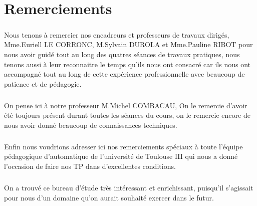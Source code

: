 \documentclass[12pt, a4paper, openany]{report}
\begin{document}
\chapter*{Remerciements}
  
  \paragraph{}
   Nous tenons à remercier nos encadreurs et professeurs de travaux dirigés, Mme.Euriell LE CORRONC, M.Sylvain DUROLA et Mme.Pauline RIBOT pour nous avoir guidé tout au long des quatres séances de travaux pratiques, nous tenons aussi à leur reconnaitre le temps qu'ils nous ont consacré car ils nous ont accompagné tout au long de cette expérience professionnelle avec beaucoup de patience et de pédagogie. \\ 
   
  \paragraph{}
   On pense ici à notre professeur M.Michel COMBACAU, On le remercie d’avoir été toujours présent durant toutes les séances du cours, on le remercie encore de nous avoir donné beaucoup de connaissances techniques.\\
 
  \paragraph{} 
   Enfin nous voudrions adresser ici nos remerciements spéciaux à toute l’équipe pédagogique d’automatique de l'université de Toulouse III qui nous a donné l’occasion de faire nos TP dans d'excellentes conditions.   \\

  \paragraph{}  
  On a trouvé ce bureau d’étude  très intéressant et enrichissant, puisqu’il s’agissait pour nous d’un domaine qu'on aurait souhaité exercer dans le futur. \\
   
\renewcommand{\contentsname}{Sommaire}
\tableofcontents
\listoffigures



%
%
%
%

  
\end{document}
